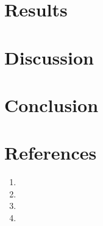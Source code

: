 \documentclass[11pt,english,numbers=endperiod,parskip=half,abstract=on]{scrartcl}
\begin{document}
\section{Results}

\section{Discussion}

\section{Conclusion}

\section{References}
  \begin{enumerate}
    \item{

    }
    \item{

    }
    \item{

    }
    \item{

    }
  \end{enumerate}
\end{document}
